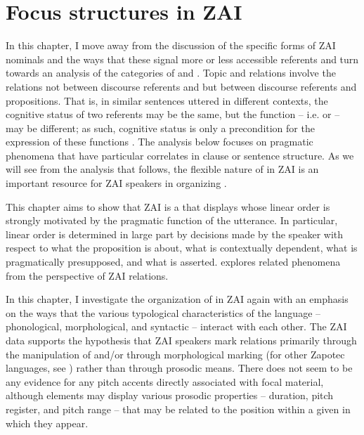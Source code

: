 

\chapter{Focus structures in ZAI}\label{focuschapter} 

In this chapter, I move away from the discussion of the specific forms of ZAI nominals and the ways that these signal more or less accessible referents and turn towards an analysis of the  categories of  and . Topic and  relations involve the relations not between discourse referents and  but between discourse referents and propositions. That is, in similar sentences uttered in different contexts, the cognitive status of two referents may be the same, but the function -- i.e.  or  -- may be different; as such, cognitive status is only a precondition for the expression of these functions \citep{lambrecht1994}. The analysis below focuses on pragmatic phenomena that have particular correlates in clause or sentence structure. As we will see from the analysis that follows, the flexible nature of  in ZAI is an important resource for ZAI speakers in organizing .

This chapter aims to show that ZAI is a  that displays  whose linear order is strongly motivated by the pragmatic function of the utterance. In particular, linear order is determined in large part by decisions made by the speaker with respect to what the proposition is about, what is contextually dependent, what is pragmatically presupposed, and what is asserted.  explores related phenomena from the perspective of ZAI  relations. 

In this chapter, I investigate the organization of  in ZAI again with an emphasis on the ways that the various typological characteristics of the language -- phonological, morphological, and syntactic -- interact with each other. The ZAI data supports the hypothesis that ZAI speakers mark  relations primarily through the manipulation of  and/or through morphological marking (for other Zapotec languages, see \citealt{broadwell1999b,lee2000}) rather than through prosodic means. There does not seem to be any evidence for any pitch accents directly associated with focal material, although elements may display various prosodic properties -- duration, pitch register, and pitch range -- that may be related to the position within a given  in which they appear.

